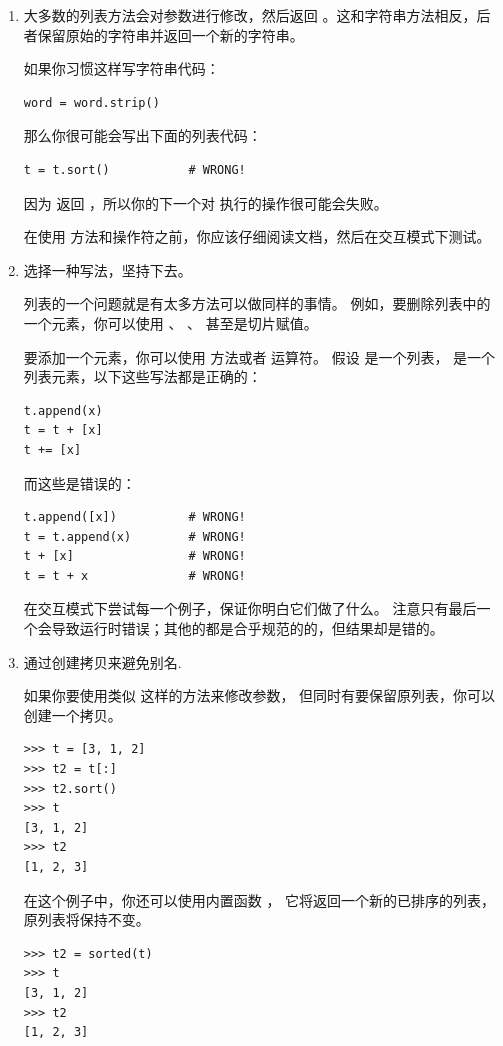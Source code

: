 \begin{enumerate}

\item 大多数的列表方法会对参数进行修改，然后返回  。这和字符串方法相反，后者保留原始的字符串并返回一个新的字符串。

如果你习惯这样写字符串代码：

\begin{lstlisting}
word = word.strip()
\end{lstlisting}

那么你很可能会写出下面的列表代码：

\begin{lstlisting}
t = t.sort()           # WRONG!
\end{lstlisting}

因为  返回  ，所以你的下一个对  执行的操作很可能会失败。

在使用  方法和操作符之前，你应该仔细阅读文档，然后在交互模式下测试。

\item 选择一种写法，坚持下去。

列表的一个问题就是有太多方法可以做同样的事情。  例如，要删除列表中的一个元素，你可以使用  、  、  甚至是切片赋值。

 要添加一个元素，你可以使用  方法或者 \li{+} 运算符。 假设  是一个列表， 是一个列表元素，以下这些写法都是正确的：

\begin{lstlisting}
t.append(x)
t = t + [x]
t += [x]
\end{lstlisting}

而这些是错误的：

\begin{lstlisting}
t.append([x])          # WRONG!
t = t.append(x)        # WRONG!
t + [x]                # WRONG!
t = t + x              # WRONG!
\end{lstlisting}

在交互模式下尝试每一个例子，保证你明白它们做了什么。  注意只有最后一个会导致运行时错误；其他的都是合乎规范的的，但结果却是错的。


\item 通过创建拷贝来避免别名.
  

如果你要使用类似  这样的方法来修改参数，
   但同时有要保留原列表，你可以创建一个拷贝。


\begin{lstlisting}
>>> t = [3, 1, 2]
>>> t2 = t[:]
>>> t2.sort()
>>> t
[3, 1, 2]
>>> t2
[1, 2, 3]
\end{lstlisting}

在这个例子中，你还可以使用内置函数 ， 它将返回一个新的已排序的列表，原列表将保持不变。

\begin{lstlisting}
>>> t2 = sorted(t)
>>> t
[3, 1, 2]
>>> t2
[1, 2, 3]
\end{lstlisting}

\end{enumerate}


